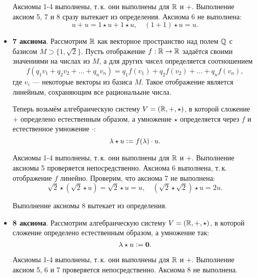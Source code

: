 \begin{orangebox}
\begin{itemize}
            Аксиомы 1-4 выполнены, т.\,к. они выполнены для $\mathbb{R}$ и $+$. Выполнение аксиом 5, 7 и 8 сразу вытекает из определения. Аксиома 6 не выполнена:
            $$
            u + u = 1 \star u + 1 \star u,\quad (1 + 1) \star u = u.
            $$
        \item \textbf{7 аксиома}. Рассмотрим $\mathbb{R}$ как векторное пространство над полем $\mathbb{Q}$ с базисом $M \supset \{1, \sqrt{2}\}$. Пусть отображение $f: \mathbb{R} \rightarrow \mathbb{R}$ задаётся своими значениями на числах из $M$, а для других чисел определяется соотношением
            $$
            f(q_1v_1 + q_2v_2 + \ldots + q_nv_n) = q_1f(v_1) + q_2f(v_2) + \ldots + q_nf(v_n),
            $$
            где $v_i$ --- некоторые векторы из базиса $M$. Такое отображение является линейным, сохраняющим все рациональыне числа.

            Теперь возьмём алгебраическую систему $V = (\mathbb{R}, +, \star)$, в которой сложение $+$ определено естественным образом, а умножение $\star$ определяется через $f$ и естественное умножение $\boldsymbol{\cdot}$:
            $$
            \lambda \star u \vcentcolon = f(\lambda) \cdot u.
            $$

            Аксиомы 1-4 выполнены, т.\,к. они выполнены для $\mathbb{R}$ и $+$. Выполнение аксиомы 5 проверяется непосредственно. Аксиома 6 выполнена, т.\,к. отображение $f$ линейно. Проверим, что аксиома 7 не выполнена:
            $$
            \sqrt{2} \star (\sqrt{2} \star u) = \sqrt{2} \star u = u,\quad (\sqrt{2} \star \sqrt{2}) \star u = 2u.
            $$

            Выполнение аксиомы 8 вытекает из определения.
        \item \textbf{8 аксиома}. Рассмотрим алгебраическую систему $V = (\mathbb{R}, +, \star)$, в которой сложение определено естественным образом, а умножение так:
            $$
            \lambda \star u \vcentcolon = \boldsymbol{0}.
            $$

            Аксиомы 1-4 выполнены, т.\,к. они выполнены для $\mathbb{R}$ и $+$. Выполнение аксиом 5, 6 и 7 проверяется непосредственно. Аксиома 8 не выполнена.
    \end{itemize}
\end{orangebox}

